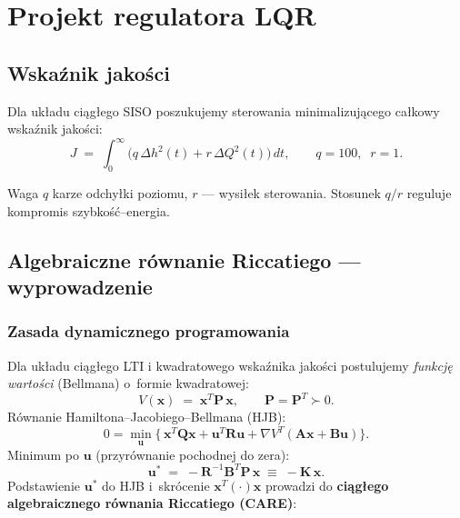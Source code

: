 \documentclass[11pt,a4paper]{article}
\begin{document}
\section{Projekt regulatora LQR}

\subsection{Wskaźnik jakości}

Dla układu ciągłego SISO poszukujemy sterowania minimalizującego całkowy
wskaźnik jakości:
\begin{equation}
J \;=\; \int_{0}^{\infty}\!\!\Big(q\,\Delta h^{2}(t) + r\,\Delta Q^{2}(t)\Big)\,dt,
\qquad q=100,\;\; r=1.
\end{equation}

Waga $q$ karze odchyłki poziomu, $r$ --- wysiłek sterowania. Stosunek
$q/r$ reguluje kompromis szybkość--energia.

\subsection{Algebraiczne równanie Riccatiego --- wyprowadzenie}

\subsubsection*{Zasada dynamicznego programowania}

Dla układu ciągłego LTI i kwadratowego wskaźnika jakości postulujemy
\emph{funkcję wartości} (Bellmana) o~formie kwadratowej:
\begin{equation}
V(\mathbf x) \;=\; \mathbf x^{T} \mathbf P\,\mathbf x, \qquad
\mathbf P = \mathbf P^{T} \succ 0.
\end{equation}
Równanie Hamiltona--Jacobiego--Bellmana (HJB):
\begin{equation}
0 = \min_{\mathbf u}\Big\{\,\mathbf x^{T}\mathbf Q\mathbf x
+ \mathbf u^{T}\mathbf R\mathbf u
+ \nabla V^{T}(\mathbf A\mathbf x + \mathbf B\mathbf u)\Big\}.
\end{equation}
Minimum po $\mathbf u$ (przyrównanie pochodnej do zera):
\begin{equation}
\mathbf u^{*} \;=\; -\mathbf R^{-1}\mathbf B^{T}\mathbf P\,\mathbf x
\;\equiv\; -\mathbf K\,\mathbf x.
\label{eq:optu}
\end{equation}
Podstawienie $\mathbf u^{*}$ do HJB i~skrócenie $\mathbf x^{T}(\cdot)\mathbf x$
prowadzi do \textbf{ciągłego algebraicznego równania Riccatiego (CARE)}:
\end{document}
